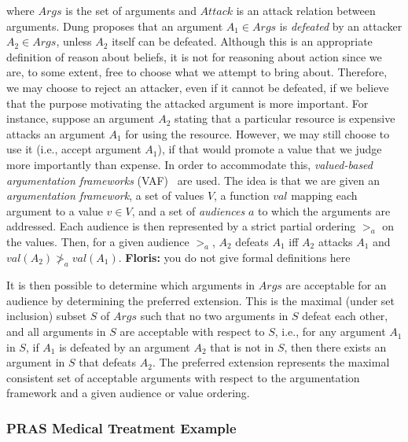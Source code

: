 \documentclass[11.5pt,two column]{llncs}
\newcommand{\floris}[1]{{\color{red}\textbf{Floris: }#1}}
\begin{document}
 where $Args$ is the set of arguments and $Attack$ is an attack relation between arguments. Dung proposes that an argument $A_1\in Args$ is \emph{defeated} by an attacker $A_2\in Args$, unless $A_2$ itself can be defeated. Although this is an appropriate definition of reason about beliefs, it is not for reasoning about action since we are, to some extent, free to choose what we attempt to bring about. Therefore, we may choose to reject an attacker, even if it cannot be defeated, if we believe that the purpose motivating the attacked argument is more important. For instance, suppose an argument $A_2$ stating that a particular resource is expensive attacks an argument $A_1$ for using the resource. However, we may still choose to use it (i.e., accept argument $A_1$), if that would promote a value that we judge more importantly than expense. In order to accommodate this, \emph{valued-based argumentation frameworks} (VAF)~\cite{bench2003persuasion} are used. The idea is that we are given an \emph{argumentation framework}, a set of values $V$, a function $val$ mapping each argument to a value $v\in V$, and a set of \emph{audiences} $a$ to which the arguments are addressed. Each audience is then represented by a strict partial ordering $>_a$ on the values. Then, for a given audience $>_a$, $A_2$ defeats $A_1$ iff $A_2$ attacks $A_1$ and $val(A_2)\not>_a val(A_1)$. \floris{you do not give formal definitions here}

It is then possible to determine which arguments in $Args$ are acceptable for an audience by determining the preferred extension. This is the maximal (under set inclusion) subset $S$ of $Args$ such that no two arguments in $S$ defeat each other, and all arguments in $S$ are acceptable with respect to $S$, i.e., for any argument $A_1$ in $S$, if $A_1$ is defeated by an argument $A_2$ that is not in $S$, then there exists an argument in $S$ that defeats $A_2$. The preferred extension represents the maximal consistent set of acceptable arguments with respect to the argumentation framework and a given audience or value ordering. 

\subsubsection{PRAS Medical Treatment Example} %
\label{sect:background:pras:example}
\end{document}
